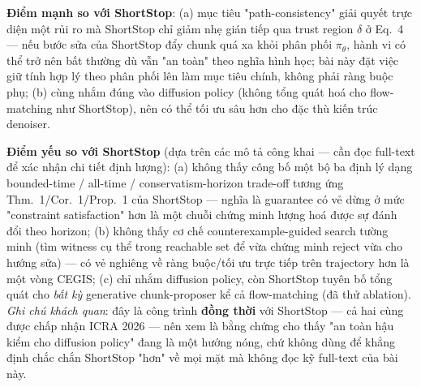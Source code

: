 \documentclass[a4paper,12pt]{article}
\begin{document}
\textbf{Điểm mạnh so với ShortStop}: (a) mục tiêu "path-consistency" giải quyết trực diện một rủi ro mà ShortStop chỉ giảm nhẹ gián tiếp qua trust region $\delta$ ở Eq.~4 — nếu bước sửa của ShortStop đẩy chunk quá xa khỏi phân phối $\pi_\theta$, hành vi có thể trở nên bất thường dù vẫn "an toàn" theo nghĩa hình học; bài này đặt việc giữ tính hợp lý theo phân phối lên làm mục tiêu chính, không phải ràng buộc phụ; (b) cùng nhắm đúng vào diffusion policy (không tổng quát hoá cho flow-matching như ShortStop), nên có thể tối ưu sâu hơn cho đặc thù kiến trúc denoiser.

\textbf{Điểm yếu so với ShortStop} (dựa trên các mô tả công khai — cần đọc full-text để xác nhận chi tiết định lượng): (a) không thấy công bố một bộ ba định lý dạng bounded-time / all-time / conservatism-horizon trade-off tương ứng Thm.~1/Cor.~1/Prop.~1 của ShortStop — nghĩa là guarantee có vẻ dừng ở mức "constraint satisfaction" hơn là một chuỗi chứng minh lượng hoá được sự đánh đổi theo horizon; (b) không thấy cơ chế counterexample-guided search tường minh (tìm witness cụ thể trong reachable set để vừa chứng minh reject vừa cho hướng sửa) — có vẻ nghiêng về ràng buộc/tối ưu trực tiếp trên trajectory hơn là một vòng CEGIS; (c) chỉ nhắm diffusion policy, còn ShortStop tuyên bố tổng quát cho \emph{bất kỳ} generative chunk-proposer kể cả flow-matching (đã thử ablation). \emph{Ghi chú khách quan}: đây là công trình \textbf{đồng thời} với ShortStop --- cả hai cùng được chấp nhận ICRA 2026 --- nên xem là bằng chứng cho thấy "an toàn hậu kiểm cho diffusion policy" đang là một hướng nóng, chứ không dùng để khẳng định chắc chắn ShortStop "hơn" về mọi mặt mà không đọc kỹ full-text của bài này.
\end{document}
